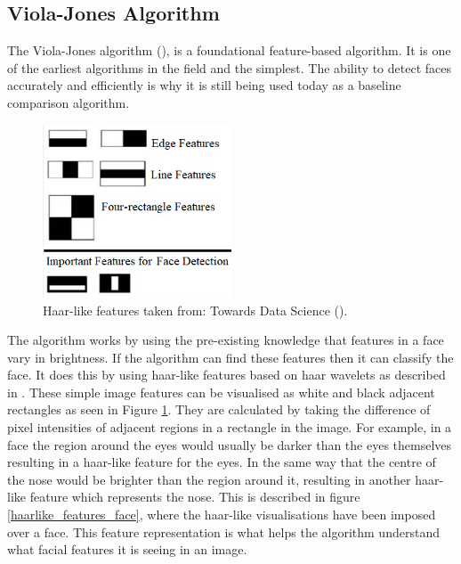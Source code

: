 \documentclass{l4proj}
\begin{document}
\subsection{Viola-Jones Algorithm}
\label{viola}
The Viola-Jones algorithm (\cite{viola}), is a foundational feature-based algorithm. It is one of the earliest algorithms in the field and the simplest. The ability to detect faces accurately and efficiently is why it is still being used today as a baseline comparison algorithm.
\begin{figure}[h!]
\centering
  \begin{minipage}{\textwidth}
  \centering

    \includegraphics[width=0.5\textwidth]{images/haarlike_features.png}
    \caption{Haar-like features taken from: Towards Data Science (\cite{haarlikeimage}).}
    \label{haarlike_features}
  \end{minipage}  
\end{figure}

The algorithm works by using the pre-existing knowledge that features in a face vary in brightness. If the algorithm can find these features then it can classify the face. It does this by using haar-like features based on haar wavelets as described in \cite{haar}. These simple image features can be visualised as white and black adjacent rectangles as seen in Figure \ref{haarlike_features}. They are calculated by taking the difference of pixel intensities of adjacent regions in a rectangle in the image. For example, in a face the region around the eyes would usually be darker than the eyes themselves resulting in a haar-like feature for the eyes. In the same way that the centre of the nose would be brighter than the region around it, resulting in another haar-like feature which represents the nose. This is described in figure \ref{haarlike_features_face}, where the haar-like visualisations have been imposed over a face. This feature representation is what helps the algorithm understand what facial features it is seeing in an image.
 
\end{document}
